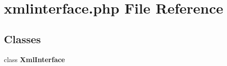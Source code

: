 \section{xmlinterface.php File Reference}
\label{xmlinterface_8php}


\subsection*{Classes}
\begin{CompactItemize}
\item 
class {\bf Xml\-Interface}
\end{CompactItemize}
